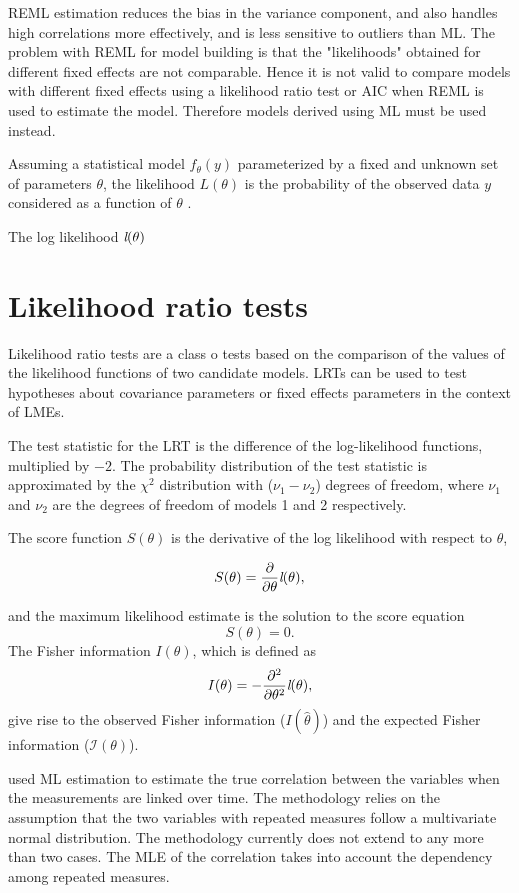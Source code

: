 \documentclass[12pt, a4paper]{report}
\begin{document}
REML estimation reduces the bias in the variance component, and also handles high correlations
more effectively, and is less sensitive to outliers than ML.  The problem with REML for model building is that the "likelihoods" obtained for different fixed effects are not comparable. Hence it is not valid to compare models
with different fixed effects using a likelihood ratio test or AIC when REML is used to
estimate the model. Therefore models derived using ML must be used instead.
\newpage



\newpage
Assuming a statistical model $f_{\theta}(y)$ parameterized by a fixed and unknown set of parameters $\theta$, the likelihood $L(\theta)$ is the probability of the observed data $y$ considered as a function of $\theta$ \citep{youngjo}.

The log likelihood $\emph{l}(\theta)$

\newpage
\section{Likelihood ratio tests}
Likelihood ratio tests are  a class o tests based on the
comparison of the values of the likelihood functions of two
candidate models. LRTs can be used to test hypotheses about
covariance parameters or fixed effects parameters in the context
of LMEs.

The test statistic for the LRT is the difference of the log-likelihood functions, multiplied by $-2$.
The probability distribution of the test statistic is approximated by the $\chi^2$ distribution with ($\nu_{1} - \nu_{2}$) degrees of freedom, where $\nu_{1}$  and $\nu_{2}$ are the degrees of freedom of models 1 and 2 respectively.

The score function $S(\theta)$ is the derivative of the log likelihood with respect to $\theta$,

\[
S(\theta) = \frac{\partial}{\partial \theta}\emph{l}(\theta),
\]

and the maximum likelihood estimate is the solution to the score equation
\[
S(\theta) = 0.
\]
The Fisher information $I(\theta)$, which is defined as
\[
I(\theta) = - \frac{\partial^2}{\partial \theta^2}\emph{l}(\theta),
\]
give rise to the observed Fisher information ($I(\hat{\theta})$) and the expected Fisher information ($\mathcal{I}(\theta)$).


\newpage
\citet{Lam} used ML estimation to estimate the true correlation between the variables when
the measurements are linked over time. The methodology relies on the assumption that the two variables with repeated measures follow a multivariate normal distribution. The methodology currently does not extend to any more than two cases. The MLE of the correlation takes into account the dependency among repeated measures.
\end{document}
